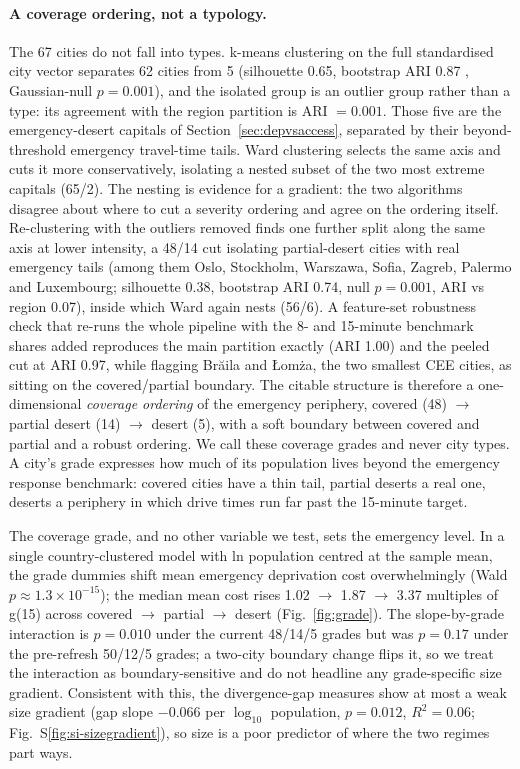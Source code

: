 \documentclass[11pt]{article}
\newcommand{\gref}{g(15)}          %
\begin{document}
\paragraph{A coverage ordering, not a typology.}
The 67 cities do not fall into types. k-means clustering on the full
standardised city vector separates 62 cities from 5 (silhouette 0.65,
bootstrap ARI 0.87 \citep{hubert1985comparing,rousseeuw1987silhouettes},
Gaussian-null $p = 0.001$), and the isolated group is an outlier group
rather than a type: its agreement with the region partition is
ARI $= 0.001$. Those five are the emergency-desert capitals of
Section~\ref{sec:depvsaccess}, separated by their beyond-threshold
emergency travel-time tails. Ward clustering selects the same axis and cuts
it more conservatively, isolating a nested subset of the two most extreme
capitals (65/2). The nesting is evidence for a gradient: the two algorithms
disagree about where to cut a severity ordering and agree on the ordering
itself. Re-clustering with the outliers removed finds one further split
along the same axis at lower intensity, a 48/14 cut isolating partial-desert
cities with real emergency tails (among them Oslo, Stockholm, Warszawa,
Sofia, Zagreb, Palermo and Luxembourg; silhouette 0.38, bootstrap ARI 0.74,
null $p = 0.001$, ARI vs region 0.07), inside which Ward again nests
(56/6). A feature-set robustness check that re-runs the whole pipeline
with the 8- and 15-minute benchmark shares added reproduces the main
partition exactly (ARI 1.00) and the peeled cut at ARI 0.97, while flagging
Br\u{a}ila and \L{}om\.za, the two smallest CEE cities, as sitting on the
covered/partial boundary. The citable structure is therefore a
one-dimensional \emph{coverage ordering} of the emergency periphery,
covered (48) $\rightarrow$ partial desert (14) $\rightarrow$ desert (5),
with a soft boundary between covered and partial and a robust ordering. We
call these coverage grades and never city types. A city's grade expresses
how much of its population lives beyond the emergency response benchmark:
covered cities have a thin tail, partial deserts a real one, deserts a
periphery in which drive times run far past the 15-minute target.

The coverage grade, and no other variable we test, sets the emergency
level. In a single country-clustered model with ln population centred at
the sample mean, the grade dummies shift mean emergency deprivation cost
overwhelmingly (Wald $p \approx 1.3\times10^{-15}$); the median mean cost
rises 1.02 $\rightarrow$ 1.87 $\rightarrow$ 3.37 multiples of \gref{}
across covered $\rightarrow$ partial $\rightarrow$ desert
(Fig.~\ref{fig:grade}). The slope-by-grade interaction is $p = 0.010$
under the current 48/14/5 grades but was $p = 0.17$ under the pre-refresh
50/12/5 grades; a two-city boundary change flips it, so we treat the
interaction as boundary-sensitive and do not headline any grade-specific
size gradient. Consistent with this, the divergence-gap measures show at
most a weak size gradient (gap slope $-0.066$ per $\log_{10}$ population,
$p = 0.012$, $R^2 = 0.06$; Fig.~S\ref{fig:si-sizegradient}), so size is a
poor predictor of where the two regimes part ways.
\end{document}
